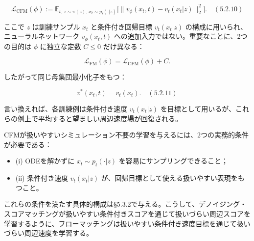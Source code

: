 \[
\mathcal{L}_{\mathrm{CFM}}(\phi):=\mathbb{E}_{t,\,z\sim\pi(z),\,x_t\sim p_t(\cdot|z)}\bigl[\|v_\phi(x_t,t)-v_t(x_t|z)\|_2^2\bigr]. \quad (5.2.10)
\]


ここで $z$ は訓練サンプル $x_t$ と条件付き回帰目標 $v_t(x_t|z)$ の構成に用いられ、ニューラルネットワーク $v_\phi(x_t,t)$ への追加入力ではない。重要なことに、2つの目的は $\phi$ に独立な定数 $C\le 0$ だけ異なる：

\[
\mathcal{L}_{\mathrm{FM}}(\phi)=\mathcal{L}_{\mathrm{CFM}}(\phi)+C.
\]


したがって同じ母集団最小化子をもつ：

\[
v^*(x_t,t)=v_t(x_t). \quad (5.2.11)
\]


言い換えれば、各訓練例は条件付き速度 $v_t(x_t|z)$ を目標として用いるが、これらの例上で平均すると望ましい周辺速度場が回復される。

CFMが扱いやすいシミュレーション不要の学習を与えるには、2つの実務的条件が必要である：

\begin{itemize}
\item (i) ODEを解かずに $x_t\sim p_t(\cdot|z)$ を容易にサンプリングできること；
\item (ii) 条件付き速度 $v_t(x_t|z)$ が、回帰目標として使える扱いやすい表現をもつこと。
\end{itemize}


これらの条件を満たす具体的構成は§5.3.2で与える。こうして、デノイジング・スコアマッチングが扱いやすい条件付きスコアを通じて扱いづらい周辺スコアを学習するように、フローマッチングは扱いやすい条件付き速度目標を通じて扱いづらい周辺速度を学習する。



